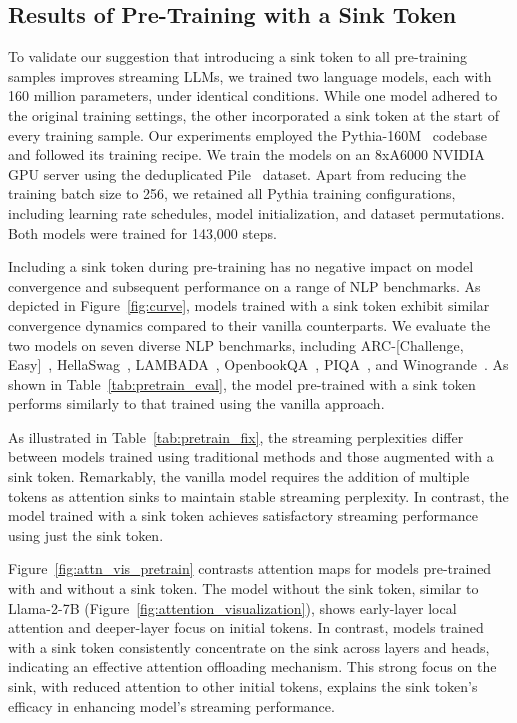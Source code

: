 \subsection{Results of Pre-Training with a Sink Token}
To validate our suggestion that introducing a sink token to all pre-training samples improves streaming LLMs, we trained two language models, each with 160 million parameters, under identical conditions. While one model adhered to the original training settings, the other incorporated a sink token at the start of every training sample. Our experiments employed the Pythia-160M~\citep{biderman2023pythia} codebase and followed its training recipe. We train the models on an 8xA6000 NVIDIA GPU server using the deduplicated Pile~\citep{pile} dataset. Apart from reducing the training batch size to 256, we retained all Pythia training configurations, including learning rate schedules, model initialization, and dataset permutations. Both models were trained for 143,000 steps.

Including a sink token during pre-training has no negative impact on model convergence and subsequent performance on a range of NLP benchmarks.
As depicted in Figure~\ref{fig:curve}, models trained with a sink token exhibit similar convergence dynamics compared to their vanilla counterparts. We evaluate the two models on seven diverse NLP benchmarks, including ARC-[Challenge, Easy]~\citep{arc}, HellaSwag~\citep{hellaswag}, LAMBADA~\citep{paperno-etal-2016-lambada}, OpenbookQA~\citep{OpenBookQA2018}, PIQA~\citep{piqa}, and Winogrande~\citep{sakaguchi2019winogrande}. As shown in Table~\ref{tab:pretrain_eval}, the model pre-trained with a sink token performs similarly to that trained using the vanilla approach.

 As illustrated in Table~\ref{tab:pretrain_fix}, the streaming perplexities differ between models trained using traditional methods and those augmented with a sink token. Remarkably, the vanilla model requires the addition of multiple tokens as attention sinks to maintain stable streaming perplexity. In contrast, the model trained with a sink token achieves satisfactory streaming performance using just the sink token.




Figure~\ref{fig:attn_vis_pretrain} contrasts attention maps for models pre-trained with and without a sink token. The model without the sink token, similar to Llama-2-7B (Figure~\ref{fig:attention_visualization}), shows early-layer local attention and deeper-layer focus on initial tokens. In contrast, models trained with a sink token consistently concentrate on the sink across layers and heads, indicating an effective attention offloading mechanism. This strong focus on the sink, with reduced attention to other initial tokens, explains the sink token's efficacy in enhancing model's streaming performance.

